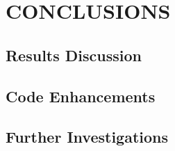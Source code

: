 \chapter{CONCLUSIONS}
\label{ch:conclusions}

\section{Results Discussion}
\section{Code Enhancements}
\section{Further Investigations}
